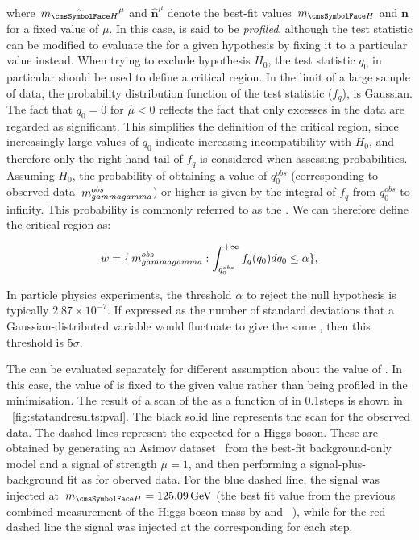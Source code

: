 where $\hat{\mH}^{\mu}$ and $\hat{\mathbf{n}}^{\mu}$ denote the best-fit values $\mH$ and $\mathbf{n}$ for a fixed value of $\mu$. In this case, \mH is said to be \emph{profiled}, although the test statistic can be modified to evaluate the \DNLL for a given \mH hypothesis by fixing it to a particular value instead. 
When trying to exclude hypothesis $H_{0}$, the test statistic $q_{0}$ in particular should be used to define a critical region. In the limit of a large sample of data, the probability distribution function of the test statistic ($f_q$), is Gaussian. The fact that $q_{0} =0$ for $\hat{\mu} < 0$ reflects the fact that only excesses in the data are regarded as significant. This simplifies the definition of the critical region, since increasingly large values of $q_{0}$ indicate increasing incompatibility with $H_{0}$, and therefore only the right-hand tail of $f_q$ is considered when assessing probabilities. Assuming $H_{0}$, the probability of obtaining a value of $q^{{obs}}_{0}$ (corresponding to observed data $ \,m_{gammagamma}^{obs}$) or higher is given by the integral of $f_q$ from $q^{{obs}}_{0}$ to infinity. This probability is commonly referred to as the \pvalue. We can therefore define the critical region as:  

\begin{equation}
w = \{ \,m_{gammagamma}^{obs} : \int_{q^{{obs}}_{0}}^{+\infty} f_q(q_{0}) dq_0  \leq \alpha \},
\end{equation}

In particle physics experiments, the threshold $\alpha$ to reject the null hypothesis is typically $2.87 \times 10^{-7}$. If expressed as the number of standard deviations that a Gaussian-distributed variable would fluctuate to give the same \pvalue, then this threshold is $5\sigma$.

The \pvalue can be evaluated separately for different assumption about the value of \mH. In this case, the value of \mH is fixed to the given value rather than being profiled in the \DNLL minimisation. The result of a scan of the \pvalue\s as a function of \mH in 0.1\GeV steps is shown in \Fig~\ref{fig:statandresults:pval}. The black solid line represents the \pvalue scan for the observed data. The dashed lines represent the expected \pvalue\s for a \SM Higgs boson. These are obtained by generating an Asimov dataset~\cite{Cowan:2010js} from the best-fit background-only model and a signal of strength $\mu=1$, and then performing a signal-plus-background fit as for oberved data. For the blue dashed line, the signal was injected at $\mH=125.09\GeV$ (the best fit value from the previous combined measurement of the Higgs boson mass by \CMS and \ATLAS~\cite{PhysRevLett.114.191803}), while for the red dashed line the signal was injected at the corresponding \mH for each step. 

